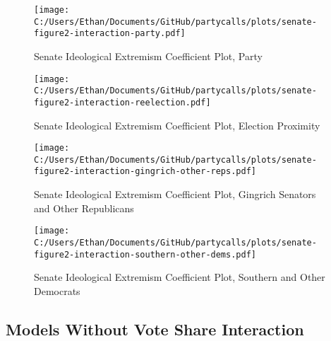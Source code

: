 \documentclass[12pt]{article}
\begin{document}
\begin{figure}[H]
	\centering
	\caption{Senate Ideological Extremism Coefficient Plot, Party}
	\texttt{[image: C:/Users/Ethan/Documents/GitHub/partycalls/plots/senate-figure2-interaction-party.pdf]}
\end{figure}

\begin{figure}[H]
	\centering
	\caption{Senate Ideological Extremism Coefficient Plot, Election Proximity}
	\texttt{[image: C:/Users/Ethan/Documents/GitHub/partycalls/plots/senate-figure2-interaction-reelection.pdf]}
\end{figure}

\begin{figure}[H]
	\centering
	\caption{Senate Ideological Extremism Coefficient Plot, Gingrich Senators and Other Republicans}
	\texttt{[image: C:/Users/Ethan/Documents/GitHub/partycalls/plots/senate-figure2-interaction-gingrich-other-reps.pdf]}
\end{figure}

\begin{figure}[H]
	\centering
	\caption{Senate Ideological Extremism Coefficient Plot, Southern and Other Democrats}
	\texttt{[image: C:/Users/Ethan/Documents/GitHub/partycalls/plots/senate-figure2-interaction-southern-other-dems.pdf]}
\end{figure}

\pagebreak

\subsection{Models Without Vote Share Interaction}
\end{document}

